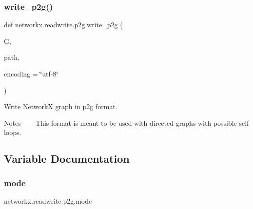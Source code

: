 \subsubsection{\texorpdfstring{write\+\_\+p2g()}{write\_p2g()}}
{\footnotesize\ttfamily def networkx.\+readwrite.\+p2g.\+write\+\_\+p2g (\begin{DoxyParamCaption}\item[{}]{G,  }\item[{}]{path,  }\item[{}]{encoding = {\ttfamily \char`\"{}utf-\/8\char`\"{}} }\end{DoxyParamCaption})}

\begin{DoxyVerb}Write NetworkX graph in p2g format.

Notes
-----
This format is meant to be used with directed graphs with
possible self loops.
\end{DoxyVerb}
 

\subsection{Variable Documentation}
\mbox{\label{namespacenetworkx_1_1readwrite_1_1p2g_afe5b4706a0fa57001ebb88764be24d83}} 
\subsubsection{\texorpdfstring{mode}{mode}}
{\footnotesize\ttfamily networkx.\+readwrite.\+p2g.\+mode}

